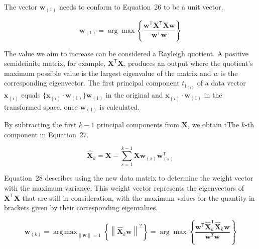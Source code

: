 \documentclass[preprint,12pt]{elsarticle}
\begin{document}
The vector $\mathbf{w}_{\left(1\right)}$ needs to conform to Equation~26 to be a unit vector.

\begin{equation}
	\mathbf{w}_{\left(1\right)}=\arg \max \left\{{\frac{\mathbf{w}^{\mathsf{T}}\mathbf{X}^{\mathsf{T}}\mathbf{Xw}}{\mathbf{w}^{\mathsf{T}}\mathbf{w}}}\right\}
	\label{eqn:26}
\end{equation}

The value we aim to increase can be considered a Rayleigh quotient. A positive semidefinite matrix, for example, $\mathbf{X}^{\mathsf{T}}\mathbf{X}$, produces an output where the quotient's maximum possible value is the largest eigenvalue of the matrix and $w$ is the corresponding eigenvector.
The first principal component  $t_{1_{\left(i\right)}}$ of a data vector $\mathbf{x}_{\left(i\right)}$ equals $\{\mathbf{x}_{\left(i\right)} \cdot \mathbf{w}_{\left(1\right)}\} \mathbf{w}_{\left(1\right)}$  in the original and $\mathbf{x}_{\left(i\right)} \cdot \mathbf{w}_{\left(1\right)}$ in the transformed space, once $\mathbf{w}_{\left(1\right)}$ is calculated.

By subtracting the first $k - 1$ principal components from $\mathbf{X}$, we obtain tThe $k$-th component in Equation~27.

\begin{equation}
	\mathbf{\hat{X}}_{k}=\mathbf{X} -\sum_{s=1}^{k-1}\mathbf{X} \mathbf{w}_{\left(s\right)}\mathbf{w}_{\left(s\right)}^{\mathsf{T}}
	\label{eqn:27}
\end{equation}

Equation~28 describes using the new data matrix to determine the weight vector with the maximum variance. This weight vector represents the eigenvectors of $\mathbf{X}^{\mathsf{T}}\mathbf{X}$ that are still in consideration, with the maximum values for the quantity in brackets given by their corresponding eigenvalues. 

\begin{equation}
	\mathbf{w}_{\left(k\right)}=\mathop{\operatorname{arg\,max}}_{\left\|\mathbf{w} \right\|=1}\left\{\left\|\mathbf{\hat{X}}_{k}\mathbf{w} \right\|^{2}\right\}=\arg \max \left\{{\frac{\mathbf{w}^{\mathsf{T}}\mathbf{\hat{X}}_{k}^{\mathsf{T}}\mathbf{\hat{X}}_{k}\mathbf{w}}{\mathbf{w}^{T}\mathbf{w}}}\right\}
	\label{eqn:28}
\end{equation}
\end{document}
